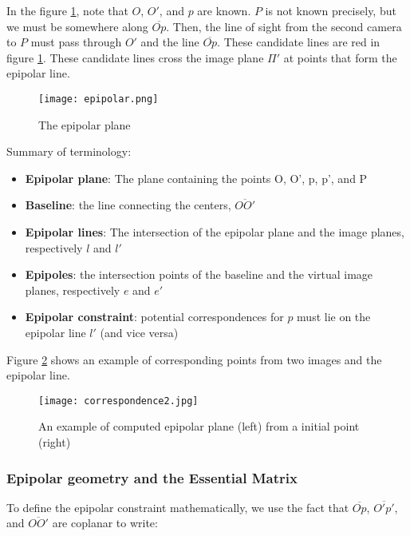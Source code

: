 \documentclass[twoside]{article}
\begin{document}
In the figure \ref{epi}, note that $O$, $O'$, and $p$ are known. $P$ is not known precisely, but we must be somewhere along $\overline{Op}$. Then, the line of sight from the second camera to $P$ must pass through $O'$ and the line $\overline{Op}$. These candidate lines are red in figure \ref{epi}. These candidate lines cross the image plane $\Pi'$ at points that form the epipolar line.

\begin{figure}[h!]
  \begin{center}
	\texttt{[image: epipolar.png]}
  \end{center}
  \caption{The epipolar plane}
  \label{epi}
\end{figure}

Summary of terminology:
\begin{itemize}
\item \textbf{Epipolar plane}: The plane containing the points O, O', p, p', and P
\item \textbf{Baseline}: the line connecting the centers, $\overline{OO'}$
\item \textbf{Epipolar lines}: The intersection of the epipolar plane and the image planes, respectively $l$ and $l'$
\item \textbf{Epipoles}: the intersection points of the baseline and the virtual image planes, respectively $e$ and $e'$
\item \textbf{Epipolar constraint}: potential correspondences for $p$ must lie on the epipolar line $l'$ (and vice versa)
\end{itemize}

Figure \ref{correspondence} shows an example of corresponding points from two images and the epipolar line.

\begin{figure}[h!]
  \begin{center}
	\texttt{[image: correspondence2.jpg]}  \end{center}
  \caption{An example of computed epipolar plane (left) from a initial point (right)}
  \label{correspondence}
\end{figure}

\subsubsection{Epipolar geometry and the Essential Matrix}

To define the epipolar constraint mathematically, we use the fact that $\overline{Op}$, $\overline{O'p'}$, and $\overline{OO'}$ are coplanar to write:
\end{document}

